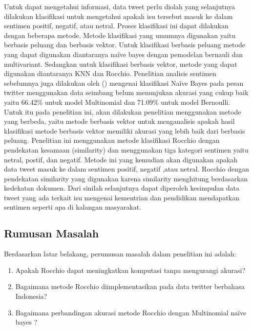 Untuk dapat mengetahui informasi, data tweet perlu diolah yang selanjutnya dilakukan klasifikasi untuk mengetahui apakah isu tersebut masuk ke dalam sentimen positif, negatif, atau netral. Proses klasifikasi ini dapat dilakukan dengan beberapa metode. Metode klasifikasi yang umumnya digunakan yaitu berbasis peluang dan berbasis vektor. Untuk klasifikasi berbasis peluang metode yang dapat digunakan diantaranya naïve bayes dengan pemodelan bernauli dan multivariant. Sedangkan untuk klasifikasi berbasis vektor, metode yang dapat digunakan diantaranya KNN dan Rocchio. \newline
Penelitian analisis sentimen sebelumnya juga dilakukan oleh \cite{ADITYAWAN2014} (\cite*{ADITYAWAN2014}) mengenai klasifikasi Naïve Bayes pada pesan twitter menggunakan data seimbang belum menunjukan akurasi yang cukup baik yaitu 66.42\% untuk model Multinomial dan 71.09\% untuk model Bernoulli. Untuk itu pada penelitian ini, akan dilakukan penelitian menggunakan metode yang berbeda, yaitu metode berbasis vektor untuk menganalisis apakah hasil klasifikasi metode berbasis vektor memiliki akurasi yang lebih baik dari berbasis peluang. \newline
Penelitian ini menggunakan metode klasifikasi Rocchio dengan pendekatan kesamaan (similarity) dan menggunakan tiga kategori sentimen yaitu netral, postif, dan negatif. Metode ini yang kemudian akan digunakan apakah data tweet masuk ke dalam sentimen positif, negatif ,atau netral. Rocchio dengan pendekatan similarity yang digunakan  karena similarity menghitung berdasarkan kedekatan dokumen. Dari sinilah selanjutnya dapat diperoleh kesimpulan data tweet yang ada terkait isu mengenai kementrian dan pendidikan mendapatkan sentimen seperti apa di kalangan masyarakat. 


\subsection*{Rumusan Masalah}
Berdasarkan latar belakang, perumusan masalah dalam penelitian ini adalah: 
\begin{enumerate}[noitemsep] 
	\item Apakah Rocchio dapat meningkatkan komputasi tanpa mengurangi akurasi?
	\item Bagaimana metode Rocchio diimplementasikan pada data twitter berbahasa Indonesia?
	\item Bagaimana perbandingan akurasi metode Rocchio dengan Multinomial naïve bayes ?
\end{enumerate}

